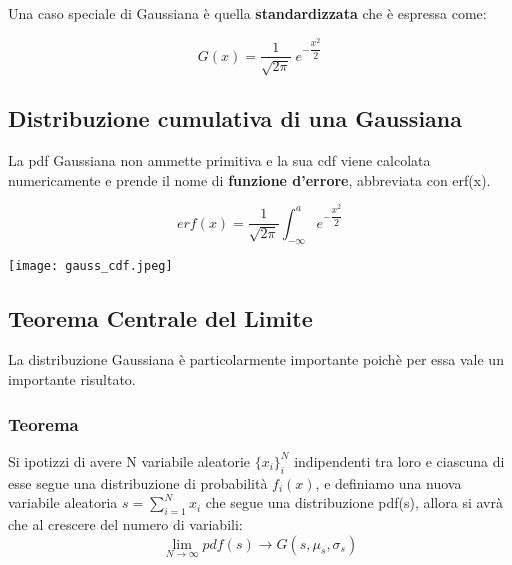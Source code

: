 \documentclass[11pt,a4paper]{book}
\begin{document}
\noindent Una caso speciale di Gaussiana \`{e} quella \textbf{standardizzata} che \`{e} espressa come:

\begin{equation*}
	G(x) = \dfrac{1}{\sqrt{2\pi}}\; e^{-\dfrac{x^2}{2}}
\end{equation*}

\subsection{Distribuzione cumulativa di una Gaussiana}

La pdf Gaussiana non ammette primitiva e la sua cdf viene calcolata numericamente e prende il nome di \textbf{funzione d'errore}, abbreviata con erf(x).

\vspace{0.3in}

  \begin{minipage}{0.5\textwidth}
\begin{equation*}
	erf(x) = \dfrac{1}{\sqrt{2\pi}} \int_{-\infty}^{a}{e^{-\dfrac{x^2}{2}}}
\end{equation*}
  \end{minipage}
  \begin{minipage}{.4\textwidth}
    \centering
    \texttt{[image: gauss\_cdf.jpeg]}

  \end{minipage}
\vspace{0.3in}

\subsection{Teorema Centrale del Limite} 

La distribuzione Gaussiana \`{e} particolarmente importante poich\`{e} per essa vale un importante risultato. 

\subsubsection{Teorema}

Si ipotizzi di avere N variabile aleatorie $\{x_i\}_i^N$ indipendenti tra loro e ciascuna di esse segue una distribuzione di probabilit\`{a} $f_i(x)$, e definiamo una nuova variabile aleatoria $s = \sum_{i=1}^Nx_{i}$ che segue una distribuzione pdf(s), allora si avr\`{a} che al crescere del numero di variabili:
\begin{equation*}
	\lim_{N \rightarrow \infty} pdf(s) \rightarrow G(s,\mu_s,\sigma_s)
\end{equation*}
\end{document}
